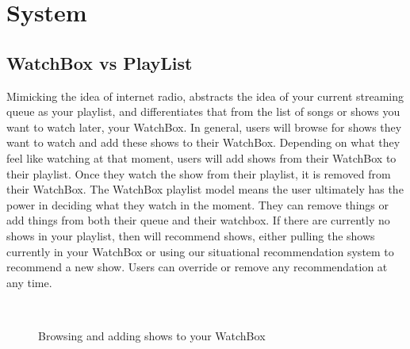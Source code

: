 \section{System}

\subsection{WatchBox vs PlayList}
Mimicking the idea of internet radio, {\sys} abstracts the idea of
your current streaming queue as your playlist, and differentiates that
from the list of songs or shows you want to watch later, your
WatchBox.  In general, users will browse for shows they want to watch
and add these shows to their WatchBox.  Depending on what they feel
like watching at that moment, users will add shows from their WatchBox
to their playlist.  Once they watch the show from their playlist, it
is removed from their WatchBox.  The WatchBox playlist model means the
user ultimately has the power in deciding what they watch in the
moment.  They can remove things or add things from both their queue
and their watchbox.  If there are currently no shows in your playlist,
then {\sys} will recommend shows, either pulling the shows currently
in your WatchBox or using our situational recommendation system to
recommend a new show.  Users can override or remove any recommendation
at any time.

\begin{figure}
\centering {}
           ~~
\caption{Browsing and adding shows to your WatchBox}
\label{fig:watchbox}
\end{figure}

